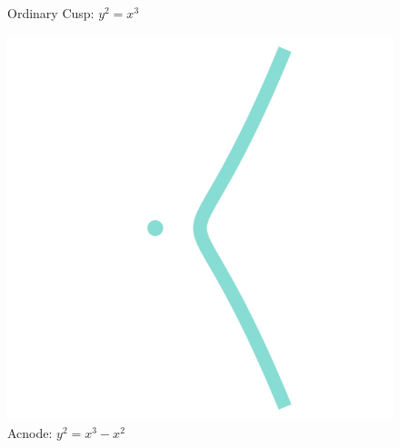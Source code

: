 \documentclass{beamer}
\begin{document}
\begin{frame}
\begin{figure}[H]
\begin{minipage}[b]{0.25\linewidth}
\caption{Ordinary Cusp: $y^2=x^3$}
\label{fig:b}
\end{minipage}
\hspace{0.5cm}
\begin{minipage}[b]{0.25\linewidth}
\centering
\includegraphics[width=\textwidth]{ch2-acnode.png}
\caption{Acnode: $y^2 = x^3 - x^2$}
\label{fig:b}
\end{minipage}
\end{figure}
\end{frame}
\end{document}
